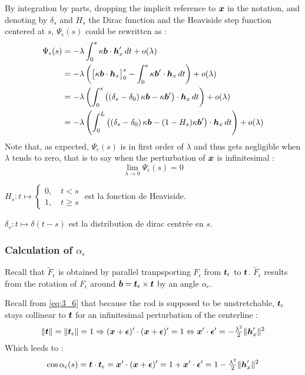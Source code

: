 By integration by parts, dropping the implicit reference to $\boldsymbol{x}$ in the notation, and denoting by $\delta_s$ and $H_s$ the Dirac function and the Heaviside step function centered at $s$, $\Psi_\epsilon(s)$ could be rewritten as :
\begin{equation}
	\begin{aligned}
		\Psi_\epsilon(s)
		&= - \lambda \int_0^s \kappa\boldsymbol{b}\cdot\boldsymbol{h}'_x \,dt + o(\lambda)\\
		&=  - \lambda \left(\big[\kappa\boldsymbol{b} \cdot  \boldsymbol{h}_x \big]_0^s - \int_0^s \kappa\boldsymbol{b}' \cdot  \boldsymbol{h}_x \,dt\right) + o(\lambda)\\
		&= - \lambda \left(\int_0^s \left(\left(\delta_s-\delta_0\right)\kappa\boldsymbol{b} - \kappa\boldsymbol{b}'\right)\cdot  \boldsymbol{h}_x \,dt\right) + o(\lambda)\\
		&= - \lambda \left(\int_0^L \left(\left(\delta_s-\delta_0\right)\kappa\boldsymbol{b} - (1-H_s)\kappa\boldsymbol{b}'\right)\cdot  \boldsymbol{h}_x \,dt\right) + o(\lambda)
	\end{aligned}
\end{equation}
Note that, as expected, $\Psi_\epsilon(s)$ is in first order of $\lambda$ and thus gets negligible when $\lambda$ tends to zero, that is to say when the perturbation of $\boldsymbol{x}$ is infinitesimal :
\begin{equation}
	\lim_{\lambda \to 0} \Psi_\epsilon(s) = 0
\end{equation}

$H_s : t \mapsto \left\{\begin{array}{c}0  , \quad t<s \\1  , \quad t\geqslant s \end{array}\right.$ est la fonction de Heaviside.

$\delta_s : t \mapsto \delta(t-s)$ est la distribution de dirac centrée en $s$.

\subsubsection{Calculation of $\alpha_\epsilon$}

Recall that $\tilde{F}_\epsilon$ is obtained by parallel tranpsporting $F_\epsilon$ from $\boldsymbol{t}_\epsilon$ to $\boldsymbol{t}$.
$\tilde{F}_\epsilon$ results from the rotation of $F_\epsilon$ around $\boldsymbol{b} = \boldsymbol{t}_\epsilon \times \boldsymbol{t}$ by an angle $\alpha_\epsilon$.

Recall from \eqref{eq:3_6} that because the rod is supposed to be unstretchable, $\boldsymbol{t}_\epsilon$ stays collinear to $\boldsymbol{t}$ for an infinitesimal perturbation of the centerline :
\begin{equation}
		\|\boldsymbol{t}\| = \|\boldsymbol{t}_\epsilon\| = 1
		\Rightarrow  (\boldsymbol{x}+\boldsymbol{\epsilon})' \cdot (\boldsymbol{x}+\boldsymbol{\epsilon})' = 1
		\Leftrightarrow  \boldsymbol{x}'\cdot\boldsymbol{\epsilon}' = - \tfrac{\lambda^2}{2}\|\boldsymbol{h}_x'\|^2
\end{equation}
Which leeds to :
\begin{equation}
		\cos \alpha_\epsilon(s) = \boldsymbol{t} \cdot \boldsymbol{t}_\epsilon = \boldsymbol{x}' \cdot (\boldsymbol{x}+\boldsymbol{\epsilon})'
		= 1 + \boldsymbol{x}' \cdot \boldsymbol{\epsilon}'
		= 1 - \tfrac{\lambda^2}{2}\|\boldsymbol{h}_x'\|^2
\end{equation}

